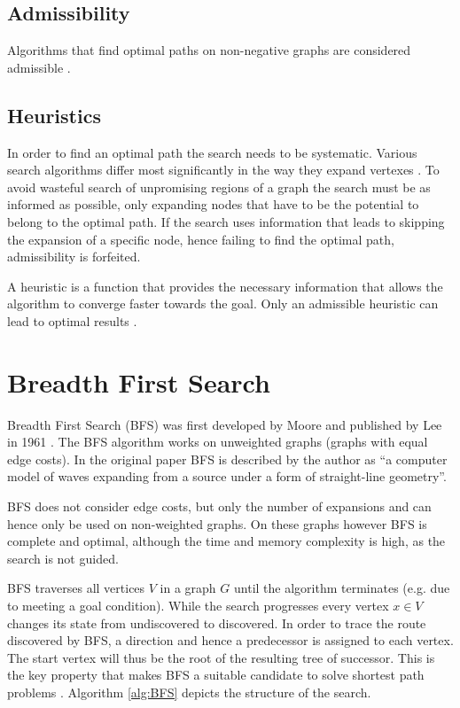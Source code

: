 \subsection{Admissibility}
Algorithms that find optimal paths on non-negative graphs are considered admissible \cite{Hart.1968}.

\subsection{Heuristics}
In order to find an optimal path the search needs to be systematic. Various search algorithms differ most significantly in the way they expand vertexes \cite{LaValle.2006}. To avoid wasteful search of unpromising regions of a graph the search must be as informed as possible, only expanding nodes that have to be the potential to belong to the optimal path. If the search uses information that leads to skipping the expansion of a specific node, hence failing to find the optimal path, admissibility is forfeited.

A heuristic is a function that provides the necessary information that allows the algorithm to converge faster towards the goal. Only an admissible heuristic can lead to optimal results \cite{Hart.1968}.

\section{Breadth First Search}
Breadth First Search (BFS) was first developed by Moore and published by Lee in 1961 \cite{LEE.1961}. The BFS algorithm works on unweighted graphs (graphs with equal edge costs). In the original paper BFS is described by the author as ``a computer model of waves expanding from a source under a form of straight-line geometry''.

BFS does not consider edge costs, but only the number of expansions and can hence only be used on non-weighted graphs. On these graphs however BFS is complete and optimal, although the time and memory complexity is high, as the search is not guided.

BFS traverses all vertices $V$ in a graph $G$ until the algorithm terminates (e.g. due to meeting a goal condition). While the search progresses every vertex $x \in V$ changes its state from undiscovered to discovered. In order to trace the route discovered by BFS, a direction and hence a predecessor is assigned to each vertex. The start vertex will thus be the root of the resulting tree of successor. This is the key property that makes BFS a suitable candidate to solve shortest path problems \cite{Skiena.2008}. Algorithm \ref{alg:BFS} depicts the structure of the search.

